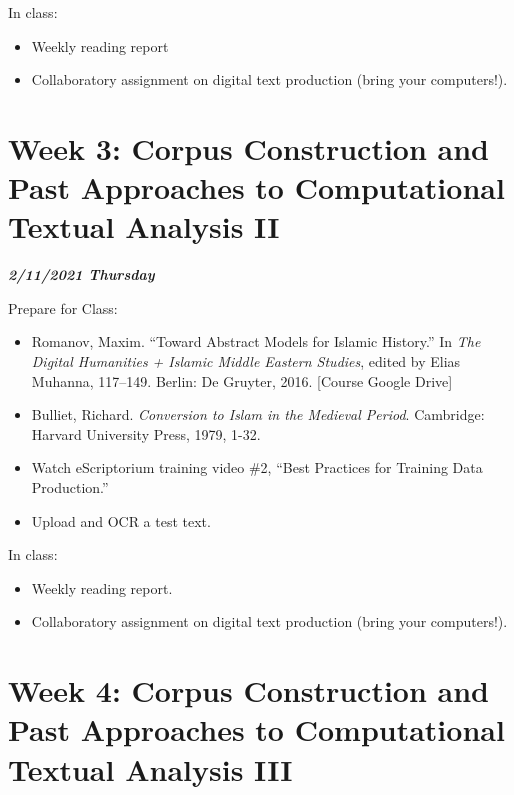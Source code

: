 \documentclass[
]{book}
\providecommand{\tightlist}{%
  \setlength{\itemsep}{0pt}\setlength{\parskip}{0pt}}
\begin{document}
In class:

\begin{itemize}
\tightlist
\item
  Weekly reading report
\item
  Collaboratory assignment on digital text production (bring your computers!).
\end{itemize}

\hypertarget{week-3-corpus-construction-and-past-approaches-to-computational-textual-analysis-ii-1}{%
\chapter{Week 3: Corpus Construction and Past Approaches to Computational Textual Analysis II}\label{week-3-corpus-construction-and-past-approaches-to-computational-textual-analysis-ii-1}}

\textbf{\emph{2/11/2021 Thursday}}

Prepare for Class:

\begin{itemize}
\tightlist
\item
  Romanov, Maxim. ``Toward Abstract Models for Islamic History.'' In \emph{The Digital Humanities + Islamic Middle Eastern Studies}, edited by Elias Muhanna, 117--149. Berlin: De Gruyter, 2016. {[}Course Google Drive{]}
\item
  Bulliet, Richard. \emph{Conversion to Islam in the Medieval Period}. Cambridge: Harvard University Press, 1979, 1-32.
\item
  Watch eScriptorium training video \#2, ``Best Practices for Training Data Production.''
\item
  Upload and OCR a test text.
\end{itemize}

In class:

\begin{itemize}
\tightlist
\item
  Weekly reading report.
\item
  Collaboratory assignment on digital text production (bring your computers!).
\end{itemize}

\hypertarget{week-4-corpus-construction-and-past-approaches-to-computational-textual-analysis-iii-1}{%
\chapter{Week 4: Corpus Construction and Past Approaches to Computational Textual Analysis III}\label{week-4-corpus-construction-and-past-approaches-to-computational-textual-analysis-iii-1}}
\end{document}
